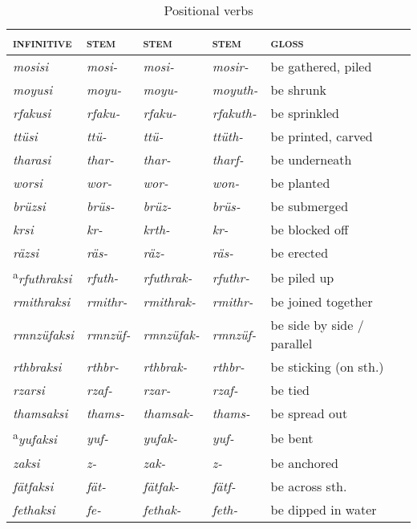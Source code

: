 \begin{table}
\caption{Positional verbs}
\label{positional.verbs}
{\small%
\begin{tabular}{lllll}
	\lsptoprule
	\textsc{infinitive} & \Pos{} \textsc{stem} & \Ext{} \textsc{stem} 	& \Rs{} \textsc{stem} 	& \textsc{gloss} \\\hline
	\emph{mosisi} &\emph{mosi-} &\emph{mosi-} &\emph{mosir-} &be gathered, piled\\
	\emph{moyusi} &\emph{moyu-} &\emph{moyu-} &\emph{moyuth-} &be shrunk\\
	\emph{rfakusi} &\emph{rfaku-} &\emph{rfaku-} &\emph{rfakuth-} &be sprinkled\\
	\emph{ttüsi} &\emph{ttü-} &\emph{ttü-} &\emph{ttüth-} &be printed, carved\\
	\emph{tharasi} &\emph{thar-} &\emph{thar-} &\emph{tharf-} &be underneath\\
	\emph{worsi} &\emph{wor-} &\emph{wor-} &\emph{won-} &be planted\\\hline
	\emph{brüzsi} &\emph{brüs-} &\emph{brüz-} &\emph{brüs-} &be submerged\\
	\emph{krsi} &\emph{kr-} &\emph{krth-} &\emph{kr-} &be blocked off\\
	\emph{räzsi} &\emph{räs-} &\emph{räz-} &\emph{räs-} &be erected\\
	\textsuperscript{a}\emph{rfuthraksi} &\emph{rfuth-} &\emph{rfuthrak-} &\emph{rfuthr-} &be piled up\\
	\emph{rmithraksi} &\emph{rmithr-} &\emph{rmithrak-}	&\emph{rmithr-} &be joined together\\
	\emph{rmnzüfaksi} &\emph{rmnzüf-} &\emph{rmnzüfak-}	&\emph{rmnzüf-} &be side by side / parallel\\
	\emph{rthbraksi} &\emph{rthbr-} &\emph{rthbrak-} &\emph{rthbr-} &be sticking (on sth.)\\
	\emph{rzarsi} &\emph{rzaf-} &\emph{rzar-} &\emph{rzaf-} &be tied\\
	\emph{thamsaksi} &\emph{thams-} &\emph{thamsak-} &\emph{thams-} &be spread out\\
	\textsuperscript{a}\emph{yufaksi} &\emph{yuf-} &\emph{yufak-} &\emph{yuf-} &be bent\\
	\emph{zaksi} &\emph{z-} &\emph{zak-} &\emph{z-} &be anchored\\\hline
	\emph{fätfaksi} &\emph{fät-} &\emph{fätfak-} &\emph{fätf-} &be across sth.\\
	\emph{fethaksi} &\emph{fe-} &\emph{fethak-} &\emph{feth-} &be dipped in water\\

\end{tabular}}
\end{table}
